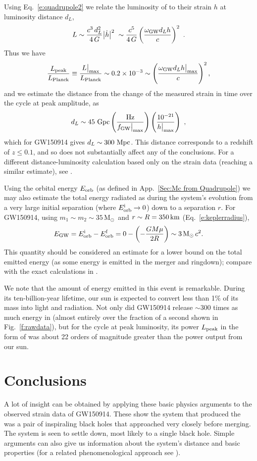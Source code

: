 \documentclass{andp2012}%
\def\w{\omega}
\def\({\left(}
\def\){\right)}
\def\be{\begin{equation}}
\def\ee{\end{equation}}
\newcommand{\inlinecite}[1]{\cite{#1}}
\newcommand{\refigure}[1]{Fig.~\ref{#1}}
\newcommand{\refapp}[1]{App.\ \ref{#1}}
\newcommand{\refeqn}[1]{Eq.\ \ref{#1}}
\def\Lplanck{L_{\rm Planck}}
\def\wgw{\w_{\rm GW}}
\def\submax{\big|_{\rm max}}
\def\fgwmax{f_{\rm GW} \submax}
\def\orb{_{\rm orb}}
\def\hmax{h\submax}
\newcommand{\Msun}{\ensuremath{\mathrm{M}_\odot\,}}
\newcommand{\MCOMPONENTAPPROX}{\ensuremath{35\, \Msun}}
\newcommand{\ORBITALSEPAPPROX}{\ensuremath{350}} %
\begin{document}
Using \refeqn{e:quadrupole2} we relate the luminosity of \GWs to their strain $h$ at luminosity distance $d_L$,
\be
L \sim \frac{c^3 \, d_L^2}{4\,G} \bigl| \dot{h} \bigr|^2 \;  \sim \frac{c^5}{4\,G} \( \frac{\wgw d_L h}{c} \)^2~.
\ee
Thus we have
\be
\frac{L_{\rm peak}}{\Lplanck} \equiv \frac{L\submax}{\Lplanck} \sim0.2 \times 10^{-3} \sim \( \frac{\wgw d_L \hmax}{c} \)^2,
\ee
and we estimate the distance
from the change of the measured strain in time
over the cycle at peak amplitude,
as
\be
d_L \sim 45 ~ {\rm Gpc} \( \frac{\rm Hz}{\fgwmax}\) \(\frac{10^{-21}}{\hmax}\) ~,
\ee
which for GW150914 gives $d_L \sim 300 ~ {\rm Mpc}$.
This distance corresponds to a redshift of $z\le 0.1$,
and so does not substantially affect any of the conclusions.
For a different distance-luminosity calculation based only on the strain data
(reaching a similar estimate),
see \inlinecite{Burko:2016vnu}.

Using the orbital energy $E\orb$ 
(as defined in \refapp{Sec:Mc from Quadrupole})
we may also estimate the total energy
radiated as \GWs during the system's evolution
from a very large initial separation (where $E\orb^{\rm i}\to 0$)
down to a separation $r$.
For GW150914, using
$m_1\sim m_2 \sim \MCOMPONENTAPPROX$
and $r\sim R = \ORBITALSEPAPPROX \, {\rm km}$ (\refeqn{e:keplerradius}),
\begin{equation}
  \label{e:total energy}
  E_{\rm GW} = E\orb^{\rm i} - E\orb^{\rm f}
  = 0 - \( - \frac{G M \mu}{2 R} \)
  \sim 3 \,\Msun c^2.
\end{equation}
This quantity should be considered an estimate
for a lower bound on the total emitted energy
(as some energy is emitted in the merger and ringdown);
compare with the exact calculations in \inlinecite{DetectionPaper, PEPaper, BetterPE}.

We note that
the amount of energy emitted in this event
is remarkable.
During its ten-billion-year lifetime,
our sun is expected to convert
less than 1\% of its mass into light and radiation.
Not only did GW150914 release
$\sim300$ times as much energy
in \GWs
(almost entirely over
the fraction of a second
shown in \refigure{f:rawdata}),
but for the cycle at peak luminosity,
its power $L_{\rm peak}$ in the form of \GWs
was about 22 orders of magnitude greater
than the power output from our sun.

\section{Conclusions}
A lot of insight can be obtained by applying these basic physics arguments
to the observed strain data of GW150914.
These show the system that produced the \GW
was a pair of inspiraling black holes that approached very closely before merging.
The system is seen to settle down, most likely to a single
black hole.
Simple arguments can also give us information
about the system's distance and basic properties
(for a related phenomenological approach
see \inlinecite{Rodriguez:2016obk}).
\end{document}
